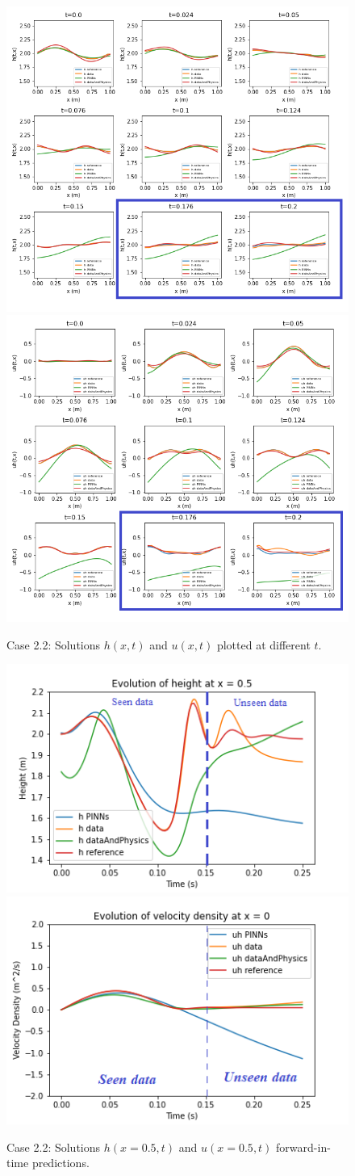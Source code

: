 \begin{figure}[h!]
\begin{center}
\includegraphics[width=0.45\linewidth]{../Code/B3/plots/h_b2.png}
\includegraphics[width=0.45\linewidth]{../Code/B3/plots/uh_b2.png}
\end{center}
\caption{Case 2.2: Solutions $h(x, t)$ and $u(x,t)$ plotted at different $t$.}\label{fig:b2_swe_time}
\end{figure}


\begin{figure}[h!]
\begin{center}
\includegraphics[width=0.45\linewidth]{./plots/h_evolution_plot_b2.png}
\includegraphics[width=0.45\linewidth]{../Code/B3/plots/uh_evolution_plot_b2.png}
\end{center}
\caption{Case 2.2: Solutions $h(x=0.5,t)$ and $u(x=0.5, t)$ forward-in-time predictions.}\label{fig:b2_swe_time_x05}
\end{figure}
